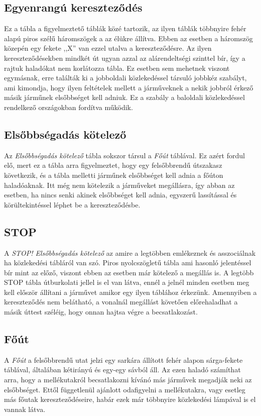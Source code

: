 \documentclass[
]{thesis-ekf}
\theoremstyle{definition}
\theoremstyle{remark}
\begin{document}
\subsection{Egyenrangú kereszteződés}
Ez a tábla a figyelmeztető táblák közé tartozik, az ilyen táblák többnyire fehér alapú piros szélű háromszögek a az élükre állítva. Ebben az esetben a háromszög közepén egy fekete ,,X'' van ezzel utalva a kereszteződésre. Az ilyen kereszteződésekben mindkét út ugyan azzal az alárendeltségi szinttel bír, így a rajtuk haladókat nem korlátozza tábla. Ez esetben sem mehetnek viszont egymásnak, erre találták ki a jobboldali közlekedéssel társuló jobbkéz szabályt, ami kimondja, hogy ilyen feltételek mellett a járműveknek a nekik jobbról érkező másik járműnek elsőbbséget kell adniuk. Ez a szabály a baloldali közlekedéssel rendelkező országokban fordítva működik. 
\subsection{Elsőbbségadás kötelező}
Az \textit{Elsőbbségadás kötelező} tábla sokszor társul a \textit{Főút} táblával. Ez azért fordul elő, mert ez a tábla arra figyelmeztet, hogy egy felsőbbrendű útszakasz következik, és a tábla melletti járműnek elsőbbséget kell adnia a főúton haladóaknak. Itt még nem kötelezik a járműveket megállásra, így abban az esetben, ha nincs senki akinek elsőbbséget kell adnia, egyszerű lassítással és körültekintéssel léphet be a kereszteződésbe.
\subsection{STOP}
A \textit{STOP! Elsőbbségadás kötelező} az amire a legtöbben emlékeznek és asszociálnak ha közlekedési tábláról van szó. Piros nyolcszögletű tábla ami hasonló jelentéssel bír mint az előző, viszont ebben az esetben már kötelező a megállás is. A legtöbb STOP tábla útburkolati jellel is el van látva, ennél a jelnél minden esetben meg kell először állítani a járművet amikor egy ilyen táblához érkezünk. Amennyiben a kereszteződés nem belátható, a vonalnál megállást követően előrehaladhat a másik úttest széléig, hogy onnan hajtsa végre a becsatlakozást.
\subsection{Főút}
A \textit{Főút} a felsőbbrendű utat jelzi egy sarkára állított fehér alapon sárga-fekete táblával, általában kétirányú és egy-egy sávból áll. Az ezen haladó számíthat arra, hogy a mellékutakról becsatlakozni kívánó más járművek megadják neki az elsőbbséget. Ettől függetlenül ajánlott odafigyelni a mellékutakra, vagy esetleg más főutak kereszteződéseire, habár ezek már többnyire közlekedési lámpával is el vannak látva.
\end{document}
